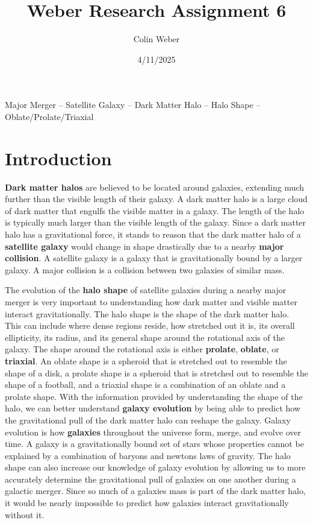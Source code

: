 \documentclass[fleqn,usenatbib]{mnras}
\title[Short title, max. 45 characters]{Weber Research Assignment 6}
\author{Colin Weber}
\date{4/11/2025}
\begin{document}
\label{firstpage}
\pagerange{\pageref{firstpage}--\pageref{lastpage}}
\maketitle

\begin{keywords}
Major Merger -- Satellite Galaxy -- Dark Matter Halo -- Halo Shape -- Oblate/Prolate/Triaxial

\end{keywords}
\section{Introduction}
        \textbf{Dark matter halos} are believed to be located around galaxies, extending much further than the visible length of their galaxy. A dark matter halo is a large cloud of dark matter that engulfs the visible matter in a galaxy. The length of the halo is typically much larger than the visible length of the galaxy. Since a dark matter halo has a gravitational force, it stands to reason that the dark matter halo of a \textbf{satellite galaxy} would change in shape drastically due to a nearby \textbf{major collision}. A satellite galaxy is a galaxy that is gravitationally bound by a larger galaxy. A major collision is a collision between two galaxies of similar mass.

        The evolution of the \textbf{halo shape} of satellite galaxies during a nearby major merger is very important to understanding how dark matter and visible matter interact gravitationally. The halo shape is the shape of the dark matter halo. This can include where dense regions reside, how stretched out it is, its overall ellipticity, its radius, and its general shape around the rotational axis of the galaxy. The shape around the rotational axis is either \textbf{prolate}, \textbf{oblate}, or \textbf{triaxial}. An oblate shape is a spheroid that is stretched out to resemble the shape of a disk, a prolate shape is a spheroid that is stretched out to resemble the shape of a football, and a triaxial shape is a combination of an oblate and a prolate shape. With the information provided by understanding the shape of the halo, we can better understand \textbf{galaxy evolution} by being able to predict how the gravitational pull of the dark matter halo can reshape the galaxy. Galaxy evolution is how \textbf{galaxies} throughout the universe form, merge, and evolve over time. A galaxy is a gravitationally bound set of stars whose properties cannot be explained by a combination of baryons and newtons laws of gravity. The halo shape can also increase our knowledge of galaxy evolution by allowing us to more accurately determine the gravitational pull of galaxies on one another during a galactic merger. Since so much of a galaxies mass is part of the dark matter halo, it would be nearly impossible to predict how galaxies interact gravitationally without it. 
\end{document}
